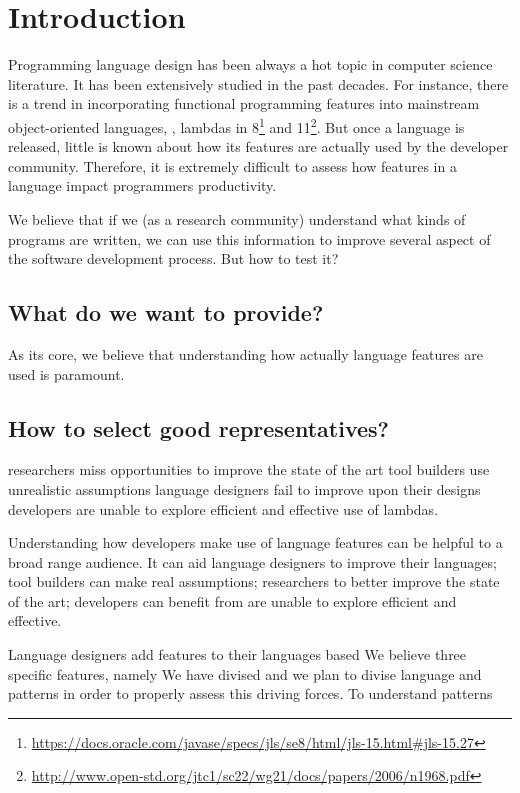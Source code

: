 
\chapter{Introduction}

Programming language design has been always a hot topic in computer science literature.
It has been extensively studied in the past decades.
For instance, there is a trend in incorporating functional programming features into mainstream object-oriented languages, \eg{}, lambdas in \java{} 8\footnote{\url{https://docs.oracle.com/javase/specs/jls/se8/html/jls-15.html\#jls-15.27}} and \cpp{}11\footnote{\url{http://www.open-std.org/jtc1/sc22/wg21/docs/papers/2006/n1968.pdf}}.
But once a language is released, little is known about how its features are actually used by the developer community.
Therefore, it is extremely difficult to assess how features in a language impact programmers productivity.

We believe that if we (as a research community) understand what kinds of programs are written, we can use this information to improve several aspect of the software development process.
But how to test it?

\section{What do we want to provide?}

As its core, we believe that understanding how actually language features are
used is paramount.


\section{How to select good representatives?}

researchers miss opportunities to improve the state of the art
tool builders use unrealistic assumptions
language designers fail to improve upon their designs
developers are unable to explore efficient and effective use of lambdas.

Understanding how developers make use of language features can be helpful to a broad range audience.
It can aid language designers to improve their languages;
tool builders can make real assumptions;
researchers to better improve the state of the art;
developers can benefit from are unable to explore efficient and effective.

Language designers add features to their languages based
We believe 
three specific features, namely
We have divised and we plan to divise language and \api{} patterns in order to properly assess this driving forces.
To understand patterns

